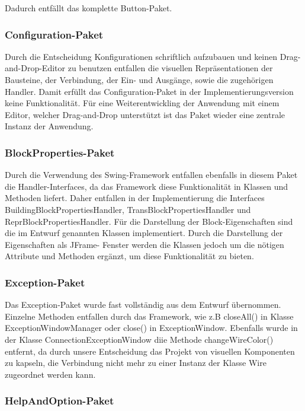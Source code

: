 \documentclass[parskip=full]{scrartcl}
\begin{document}
Dadurch entfällt das komplette Button-Paket.


\subsubsection{Configuration-Paket}

Durch die Entscheidung Konfigurationen schriftlich aufzubauen und keinen Drag-and-Drop-Editor zu benutzen entfallen die visuellen Repräsentationen der Bausteine, der Verbindung, der Ein- und Ausgänge, sowie die zugehörigen Handler. Damit erfüllt das Configuration-Paket in der Implementierungsversion keine Funktionalität. Für eine Weiterentwickling der Anwendung mit einem Editor, welcher Drag-and-Drop unterstützt ist das Paket wieder eine zentrale Instanz der Anwendung. 

\subsubsection{BlockProperties-Paket}

Durch die Verwendung des Swing-Framework entfallen ebenfalls in diesem Paket die Handler-Interfaces, da das Framework diese Funktionalität in Klassen und Methoden liefert. Daher entfallen in der Implementierung die Interfaces BuildingBlockPropertiesHandler, TransBlockPropertiesHandler und ReprBlockPropertiesHandler.
Für die Darstellung der Block-Eigenschaften sind die im Entwurf genannten Klassen implementiert. Durch die Darstellung der Eigenschaften als JFrame- Fenster werden die Klassen jedoch um die nötigen Attribute und Methoden ergänzt, um diese Funktionalität zu bieten.

\subsubsection{Exception-Paket}

Das Exception-Paket wurde fast vollständig aus dem Entwurf übernommen. Einzelne Methoden entfallen durch das Framework, wie z.B closeAll() in Klasse ExceptionWindowManager oder close() in ExceptionWindow. 
Ebenfalls wurde in der Klasse ConnectionExceptionWindow diie Methode changeWireColor() entfernt, da durch unsere Entscheidung das Projekt von visuellen Komponenten zu kapseln, die Verbindung nicht mehr zu einer Instanz der Klasse Wire zugeordnet werden kann.

\subsubsection{HelpAndOption-Paket}
\end{document}
